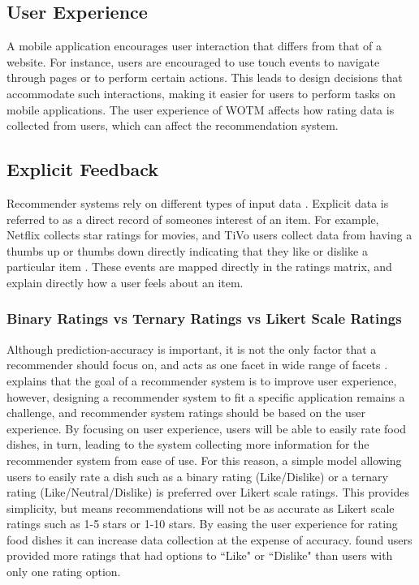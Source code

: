 

\subsection{User Experience}

A mobile application encourages user interaction that differs from that of a website. For instance, users are encouraged to use touch events to navigate through pages or to perform certain actions. This leads to design decisions that accommodate such interactions, making it easier for users to perform tasks on mobile applications. The user experience of WOTM affects how rating data is collected from users, which can affect the recommendation system.

\subsection{Explicit Feedback}

Recommender systems rely on different types of input data \cite{koren2009matrix}. Explicit data is referred to as a direct record of someones interest of an item. For example, Netflix collects star ratings for movies, and TiVo users collect data from having a thumbs up or thumbs down directly indicating that they like or dislike a particular item \cite{koren2009matrix}. These events are mapped directly in the ratings matrix, and explain directly how a user feels about an item. 

\subsubsection{Binary Ratings vs Ternary Ratings vs Likert Scale Ratings}

Although prediction-accuracy is important, it is not the only factor that a recommender should focus on, and acts as one facet in wide range of facets \cite{martin2009recsys}. \citeauthor{martin2009recsys} \cite{martin2009recsys} explains that the goal of a recommender system is to improve user experience, however, designing a recommender system to fit a specific application remains a challenge, and recommender system ratings should be based on the user experience. By focusing on user experience, users will be able to easily rate food dishes, in turn, leading to the system collecting more information for the recommender system from ease of use. For this reason, a simple model allowing users to easily rate a dish such as a binary rating (Like/Dislike) or a ternary rating (Like/Neutral/Dislike) is preferred over Likert scale ratings. This provides simplicity, but means recommendations will not be as accurate as Likert scale ratings such as 1-5 stars or 1-10 stars. By easing the user experience for rating food dishes it can increase data collection at the expense of accuracy. \citeauthor{movieratings} \cite{schafer2007collaborative, moveratings} found users provided more ratings that had options to ``Like" or ``Dislike" than users with only one rating option. 

